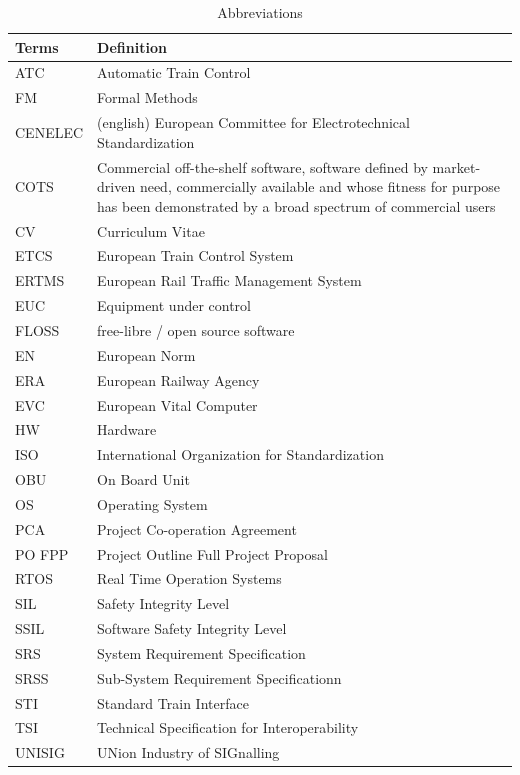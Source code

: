 \documentclass{template/openetcs_report}
\begin{document}
\begin{table} [h]
\begin{tabular}{|p{2cm}|p{12cm}|}
    \hline\hline
    \bfseries Terms & \bfseries Definition\\
    \hline\hline
    ATC & Automatic Train Control\\
    \hline
    FM & Formal Methods\\
    \hline
    CENELEC & (english) European Committee for Electrotechnical Standardization\\
    \hline
    COTS & Commercial off-the-shelf software, software defined by market-driven need, commercially available   and whose fitness for purpose has been demonstrated by a broad spectrum of commercial users\\
    \hline
    CV & Curriculum Vitae\\
    \hline
    ETCS & European Train Control System\\
    \hline
    ERTMS & European Rail Traffic Management System\\
    \hline
    EUC & Equipment under control\\
    \hline
    FLOSS & free-libre / open source software\\
    \hline
    EN & European Norm\\
    \hline
    ERA & European Railway Agency\\
    \hline
    EVC & European Vital Computer\\
    \hline
    HW & Hardware\\
    \hline
    ISO & International Organization for Standardization\\
    \hline
    OBU & On Board Unit\\
    \hline
    OS & Operating System\\
    \hline
    PCA & Project Co-operation Agreement\\
    \hline
    PO FPP & Project Outline Full Project Proposal\\
    \hline
    RTOS & Real Time Operation Systems\\
    \hline
    SIL & Safety Integrity Level\\
    \hline
    SSIL & Software Safety Integrity Level\\
    \hline
    SRS & System Requirement Specification \\
    \hline
    SRSS & Sub-System Requirement Specificationn \\
    \hline
    STI & Standard Train Interface \\
    \hline
    TSI & Technical Specification for Interoperability\\
    \hline
    UNISIG & UNion Industry of SIGnalling\\
\hline
\end{tabular}
\\
\caption{Abbreviations}
\end{table}
\end{document}
